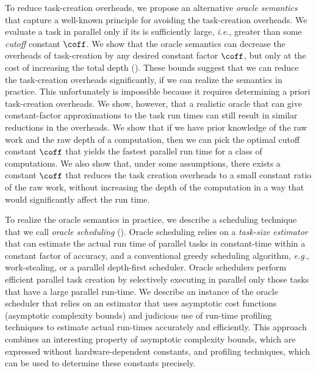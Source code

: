 To reduce task-creation overheads, we propose an alternative {\em
  oracle semantics} that capture a well-known principle for avoiding
the task-creation overheads. We evaluate a task in parallel only if
its is sufficiently large, \textit{i.e.}, greater than some {\em
  cutoff} constant $\coff$.  We show that the oracle semantics can
decrease the overheads of task-creation by any desired constant
factor $\coff$, but only at the cost of increasing the total depth
().
%
These bounds suggest that we can reduce the
task-creation overheads significantly, if we can realize the semantics
in practice.  This  unfortunately is impossible because it requires
determining a priori task-creation overheads.  We show, however, that
a realistic oracle that can give constant-factor approximations to the
task run times can still result in similar reductions in the
overheads. We show that if we have prior knowledge of the
raw work and the raw depth of a computation, then we can pick the
optimal cutoff constant $\coff$ that yields the fastest parallel run
time for a class of computations.  We also show that, under some
assumptions, there exists a constant $\coff$ that reduces the task
creation overheads to a small constant ratio of the raw work, without
increasing the depth of the computation in a way that would 
significantly affect the run time. %


To realize the oracle semantics in practice, we describe a scheduling
technique that we call {\em oracle scheduling} ().
Oracle scheduling relies on a {\em task-size estimator} that can
estimate the actual run time of parallel tasks in constant-time within
a constant factor of accuracy, and a conventional greedy scheduling
algorithm, \textit{e.g.}, work-stealing, or a parallel depth-first
scheduler.  Oracle schedulers perform efficient parallel task creation
by selectively executing in parallel only those tasks that have a
large parallel run-time. We describe an instance of the oracle
scheduler that relies on an estimator that uses asymptotic cost
functions (asymptotic complexity bounds) and judicious use of run-time
profiling techniques to estimate actual run-times accurately and
efficiently.  This approach combines an interesting property of
asymptotic complexity bounds, which are expressed without
hardware-dependent constants, and profiling techniques, which can be
used to determine these constants precisely.

